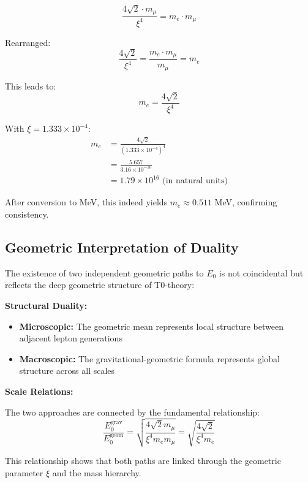 \documentclass[12pt,a4paper]{article}
\begin{document}
	\begin{equation}
		\frac{4\sqrt{2} \cdot m_\mu}{\xi^4} = m_e \cdot m_\mu
	\end{equation}
	
	Rearranged:
	\begin{equation}
		\frac{4\sqrt{2}}{\xi^4} = \frac{m_e \cdot m_\mu}{m_\mu} = m_e
	\end{equation}
	
	This leads to:
	\begin{equation}
		m_e = \frac{4\sqrt{2}}{\xi^4}
	\end{equation}
	
	With $\xi = 1.333 \times 10^{-4}$:
	\begin{align}
		m_e &= \frac{4\sqrt{2}}{(1.333 \times 10^{-4})^4}\\
		&= \frac{5.657}{3.16 \times 10^{-16}}\\
		&= 1.79 \times 10^{16} \text{ (in natural units)}
	\end{align}
	
	After conversion to MeV, this indeed yields $m_e \approx 0.511$ MeV, confirming consistency.
	
	\subsection{Geometric Interpretation of Duality}
	
	The existence of two independent geometric paths to $E_0$ is not coincidental but reflects the deep geometric structure of T0-theory:
	
	\textbf{Structural Duality:}
	\begin{itemize}
		\item \textbf{Microscopic:} The geometric mean represents local structure between adjacent lepton generations
		\item \textbf{Macroscopic:} The gravitational-geometric formula represents global structure across all scales
	\end{itemize}
	
	\textbf{Scale Relations:}
	
	The two approaches are connected by the fundamental relationship:
	\begin{equation}
		\frac{E_0^{\text{grav}}}{E_0^{\text{geom}}} = \sqrt{\frac{4\sqrt{2} m_\mu}{\xi^4 m_e m_\mu}} = \sqrt{\frac{4\sqrt{2}}{\xi^4 m_e}}
	\end{equation}
	
	This relationship shows that both paths are linked through the geometric parameter $\xi$ and the mass hierarchy.
	
\end{document}
